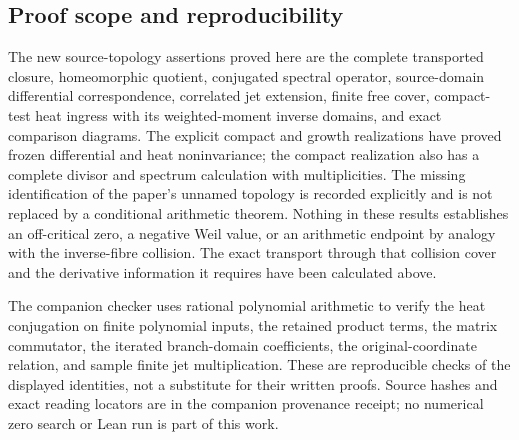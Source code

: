 \subsection{Proof scope and reproducibility}
The new source-topology assertions proved here are the complete
transported closure, homeomorphic quotient, conjugated spectral
operator, source-domain differential correspondence, correlated jet
extension, finite free cover, compact-test heat ingress with its
weighted-moment inverse domains, and exact comparison diagrams. The
explicit compact and growth realizations have proved frozen
differential and heat noninvariance; the compact realization also
has a complete divisor and spectrum calculation with multiplicities.
The missing identification of the paper's unnamed topology is
recorded explicitly and is not replaced by a conditional arithmetic
theorem. Nothing in these results establishes an off-critical zero,
a negative Weil value, or an arithmetic endpoint by analogy with
the inverse-fibre collision. The exact transport through that
collision cover and the derivative information it requires have
been calculated above.

The companion checker uses rational polynomial arithmetic to verify
the heat conjugation on finite polynomial inputs, the retained
product terms, the matrix commutator, the iterated branch-domain
coefficients, the original-coordinate relation, and sample finite
jet multiplication. These are reproducible checks of the displayed
identities, not a substitute for their written proofs. Source
hashes and exact reading locators are in the companion provenance
receipt; no numerical zero search or Lean run is part of this work.
